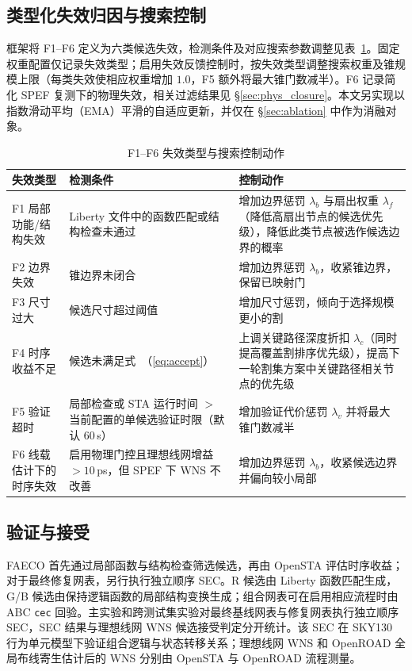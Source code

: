 \documentclass[twocolumn,10pt,fontset=windows]{ctexart}
\renewcommand{\eqref}[1]{\textup{（\ref{#1}）}}
\begin{document}
\subsection{类型化失效归因与搜索控制}

\FloatBarrier
框架将 F1--F6 定义为六类候选失效，检测条件及对应搜索参数调整见表~\ref{tab:failures}。固定权重配置仅记录失效类型；启用失效反馈控制时，按失效类型调整搜索权重及锥规模上限（每类失效使相应权重增加 $1.0$，F5 额外将最大锥门数减半）。F6 记录简化 SPEF 复测下的物理失效，相关过滤结果见 \S\ref{sec:phys_closure}。本文另实现以指数滑动平均（EMA）平滑的自适应更新，并仅在 \S\ref{sec:ablation} 中作为消融对象。

\begin{table}[!htbp]
\centering
\caption{F1--F6 失效类型与搜索控制动作}
\label{tab:failures}
\scriptsize
\setlength{\tabcolsep}{2pt}
\begin{tabular}{p{2.0cm}p{2.6cm}p{2.9cm}}
\toprule
\textbf{失效类型} & \textbf{检测条件} & \textbf{控制动作} \\
\midrule
F1 局部功能/结构失效 & Liberty 文件中的函数匹配或结构检查未通过 & 增加边界惩罚 $\lambda_b$ 与扇出权重 $\lambda_f$（降低高扇出节点的候选优先级），降低此类节点被选作候选边界的概率 \\
F2 边界失效 & 锥边界未闭合 & 增加边界惩罚 $\lambda_b$，收紧锥边界，保留已映射门 \\
F3 尺寸过大 & 候选尺寸超过阈值 & 增加尺寸惩罚，倾向于选择规模更小的割 \\
F4 时序收益不足 & 候选未满足式~\eqref{eq:accept} & 上调关键路径深度折扣 $\lambda_c$（同时提高覆盖割排序优先级），提高下一轮割集方案中关键路径相关节点的优先级 \\
F5 验证超时 & 局部检查或 STA 运行时间 $>$ 当前配置的单候选验证时限（默认 $60\,$s） & 增加验证代价惩罚 $\lambda_v$ 并将最大锥门数减半 \\
F6 线载估计下的时序失效 & 启用物理门控且理想线网增益 $>10\,$ps，但 SPEF 下 WNS 不改善 & 增加边界惩罚 $\lambda_b$，收紧候选边界并偏向较小局部 \\
\bottomrule
\end{tabular}
\end{table}

\subsection{验证与接受}\label{sec:validation}
FAECO 首先通过局部函数与结构检查筛选候选，再由 OpenSTA 评估时序收益；对于最终修复网表，另行执行独立顺序 SEC。R 候选由 Liberty 函数匹配生成，G/B 候选由保持逻辑函数的局部结构变换生成；组合网表可在启用相应流程时由 ABC \texttt{cec} 回验。主实验和跨测试集实验对最终基线网表与修复网表执行独立顺序 SEC，SEC 结果与理想线网 WNS 候选接受判定分开统计。该 SEC 在 SKY130 行为单元模型下验证组合逻辑与状态转移关系；理想线网 WNS 和 OpenROAD 全局布线寄生估计后的 WNS 分别由 OpenSTA 与 OpenROAD 流程测量。
\end{document}

